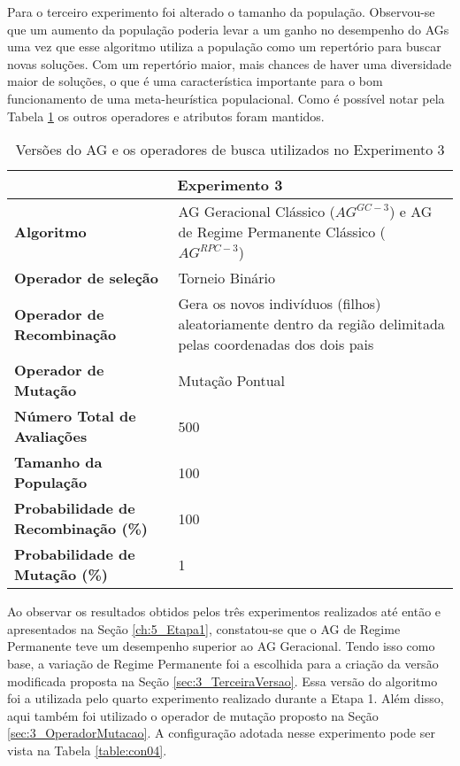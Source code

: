 Para o terceiro experimento foi alterado o tamanho da população. Observou-se que um  aumento da população  poderia levar a um ganho no desempenho do AGs uma vez que esse algoritmo utiliza a população como um repertório para buscar novas soluções. Com um repertório maior, mais chances de haver uma diversidade maior de soluções, o que é uma característica importante para o bom funcionamento de uma meta-heurística populacional. Como é possível notar pela Tabela \ref{table:con03} os outros operadores e atributos foram mantidos.
\begin{table}[!htbp]
\centering
\caption{Versões do AG e os operadores de busca utilizados no Experimento 3}
\label{table:con03}
\begin{tabular}{|p{6cm}|p{9cm}|}
\hline

\multicolumn{2}{|c|}{\textbf{Experimento 3}} \\ \hline
\textbf{Algoritmo} & AG Geracional Clássico ($AG^{GC-3}$) e AG de Regime Permanente Clássico ($AG^{RPC-3}$) \\ \hline
\textbf{Operador de seleção} & Torneio Binário \\ \hline
\textbf{Operador de Recombinação} & Gera os novos indivíduos (filhos) aleatoriamente dentro da região delimitada pelas coordenadas dos dois pais \\  \hline
\textbf{Operador de Mutação} & Mutação Pontual \\ \hline
\textbf{Número Total de Avaliações} & 500 \\ \hline
\textbf{Tamanho da População} & 100 \\ \hline
\textbf{Probabilidade de Recombinação (\%)} & 100 \\ \hline
\textbf{Probabilidade de Mutação (\%)} & 1 \\ \hline
 \end{tabular}
\end{table}

Ao observar os resultados obtidos pelos três experimentos realizados até então e apresentados na Seção \ref{ch:5_Etapa1}, constatou-se que o AG de Regime Permanente teve um desempenho superior ao AG Geracional. Tendo isso como base, a variação de Regime Permanente foi a escolhida para a criação da versão modificada proposta na Seção \ref{sec:3_TerceiraVersao}. Essa versão do algoritmo foi a utilizada pelo quarto experimento realizado durante a Etapa 1. Além disso, aqui também foi utilizado o operador de mutação proposto na Seção \ref{sec:3_OperadorMutacao}. A configuração adotada nesse experimento pode ser vista na Tabela \ref{table:con04}.


